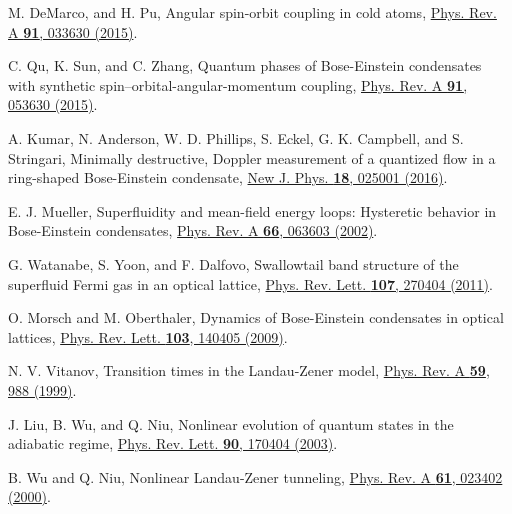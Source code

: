 \documentclass[twocolumn,prl,floatfix,citeautoscript,nofootinbib]{revtex4-1}
\begin{document}
\begin{thebibliography}{99}
 M. DeMarco, and H. Pu, {Angular spin-orbit coupling in
cold atoms}, \href{http://dx.doi.org/10.1103/PhysRevA.91.033630}{Phys. Rev.
A \textbf{91}, 033630 (2015)}.

 C. Qu, K. Sun, and C. Zhang, {Quantum phases of
Bose-Einstein condensates with synthetic spin--orbital-angular-momentum
coupling}, \href{http://dx.doi.org/10.1103/PhysRevA.91.053630}{Phys. Rev. A
\textbf{91}, 053630 (2015)}.


 A. Kumar, N. Anderson, W. D. Phillips, S. Eckel, G. K.
Campbell, and S. Stringari, {Minimally destructive, Doppler measurement of a
quantized flow in a ring-shaped Bose-Einstein condensate}, \href{https://doi.org/10.1088/1367-2630/18/2/025001}%
{New J. Phys. \textbf{18}, 025001 (2016)}.


 E. J. Mueller, {Superfluidity and mean-field energy
loops: Hysteretic behavior in Bose-Einstein condensates}, \href{https://doi.org/10.1103/PhysRevA.66.063603}%
{Phys. Rev. A \textbf{66}, 063603 (2002)}.

 G. Watanabe, S. Yoon, and F. Dalfovo, {Swallowtail
band structure of the superfluid Fermi gas in an optical lattice}, \href{https://doi.org/10.1103/PhysRevLett.107.270404}%
{Phys. Rev. Lett. \textbf{107}, 270404 (2011)}.

 O. Morsch and M. Oberthaler, {Dynamics of Bose-Einstein
condensates in optical lattices}, \href{https://doi.org/10.1103/PhysRevLett.103.140405}%
{Phys. Rev. Lett. \textbf{103}, 140405 (2009)}.


 N. V. Vitanov, {Transition times in the Landau-Zener
model}, \href{https://doi.org/10.1103/PhysRevA.59.988}{Phys. Rev. A \textbf{%
59}, 988 (1999)}.

 J. Liu, B. Wu, and Q. Niu, {Nonlinear evolution of quantum
states in the adiabatic regime}, \href{https://doi.org/10.1103/PhysRevLett.90.170404}%
{Phys. Rev. Lett. \textbf{90}, 170404 (2003)}.

 B. Wu and Q. Niu, {Nonlinear Landau-Zener tunneling}, \href{http://doi.org/10.1103/PhysRevA.61.023402}%
{Phys. Rev. A \textbf{61}, 023402 (2000)}.




\end{thebibliography}
\end{document}
